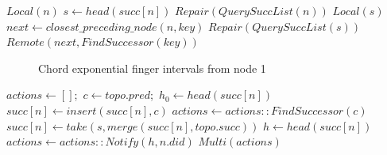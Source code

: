 \documentclass[journal]{IEEEtran}
\begin{document}
\begin{algorithm}[htbp]
\caption{DHT Lookup Algorithm}
\label{alg:lookup}
\begin{algorithmic}[1]
        \State \Return $Local(n)$
    \EndIf
    \State $s\gets head(succ[n])$
        \State \Return $Repair(QuerySuccList(n))$
    \EndIf
    \If{$key \in (n.did, s]$}
        \State \Return $Local(s)$
    \EndIf
    \State $next\gets \mathit{closest\_preceding\_node}(n, key)$
        \State \Return $Repair(QuerySuccList(s))$
    \Else
        \State \Return $Remote(next, \mathit{FindSuccessor}(key))$
    \EndIf
\EndFunction
\end{algorithmic}
\end{algorithm}

\begin{figure}[htbp]
      \begin{center}
      \end{center}
      \caption{Chord exponential finger intervals from node 1}
      \label{lookup-figure}
\end{figure}

\begin{algorithm}[htbp]
\caption{DHT Stabilization}
\label{alg:stabilize}
\begin{algorithmic}[1]
\State $actions\gets []$;\ $c\gets topo.pred$;\ $h_0\gets head(succ[n])$
\State $succ[n]\gets insert(succ[n], c)$
\State $actions\gets actions :: FindSuccessor(c)$
\EndIf
\State $succ[n]\gets take(s, merge(succ[n], topo.succ))$
\State $h\gets head(succ[n])$
\State $actions\gets actions :: Notify(h, n.did)$
\EndIf
\State \Return $Multi(actions)$
\EndProcedure
\end{algorithmic}
\end{algorithm}
\end{document}
